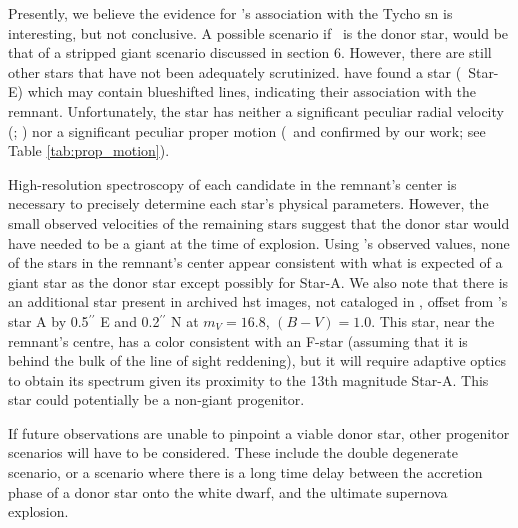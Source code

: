 Presently, we believe the evidence for \starg's association with the Tycho \gls*{sn} is interesting, but not conclusive.
A possible scenario if \starg\ is the donor star, would be that of a stripped giant scenario discussed in section 6.  
However, there are still other stars that have not been adequately
scrutinized. \citet{2007PASJ...59..811I} have found a star (\rl\
Star-E) which may contain blueshifted  lines, indicating their
association with the remnant. Unfortunately, the star has neither
a significant peculiar radial velocity (\citealt{2007PASJ...59..811I}; \rl)
 nor a significant peculiar proper motion (\rl\ and confirmed by
our work; see Table \ref{tab:prop_motion}).

High-resolution spectroscopy of each candidate in the remnant's center is necessary to
precisely determine each star's physical parameters. However, the small observed
velocities of the remaining stars suggest that the donor star would
have needed to be a giant at the time of explosion. Using \rl's
observed values, none of the stars in the remnant's center appear
consistent with what is expected of a giant star as the donor star
except possibly for Star-A.  We also note that there is an additional
star present in archived \gls{hst} images, not cataloged in \rl, offset from \rl's star A  by
0.5$^{\prime\prime}$ E and 0.2$^{\prime\prime}$ N at $m_V=16.8$,
$(B-V)=1.0$. This star, near the remnant's centre, has a color
consistent with an F-star (assuming that it is behind the bulk of the
line of sight reddening), but it will require adaptive optics to
obtain its spectrum given its proximity to the 13th magnitude Star-A. This star could potentially be a non-giant
progenitor.

If future observations are unable to pinpoint a viable donor star,
other progenitor scenarios will have to be considered. These include
the double degenerate scenario, or a scenario where there is a long
time delay between the accretion phase of a donor star onto the white dwarf, and the ultimate supernova
explosion.

